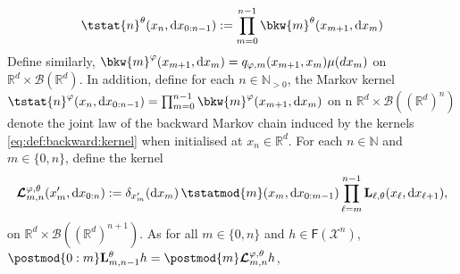 \documentclass{article}
\newcommand{\Xfd}{\mathcal{X}}
\newcommand{\precpar}{\varphi}
\newcommand{\intvect}[2]{\{ #1, #2 \}}
\newcommand{\nset}{\mathbb{N}}
\newcommand{\nsetpos}{\mathbb{N}_{> 0}}
\newcommand{\1}{\mathbbm{1}}
\newcommand{\retrokmod}{\boldsymbol{\mathcal{L}}^{\precpar,\theta}}
\newcommand{\uk}[1]{\mathbf{L}_{#1}}
\newcommand{\tensprod}{\otimes}
\newcommand{\Xset}{\mathsf{X}}
\newcommand{\parvec}{\theta}
\newcommand{\bmf}[1]{\set{F}(#1)}
\newcommand{\set}[1]{\mathsf{#1}}
\newcommand{\rmd}{\ensuremath{\mathrm{d}}}
\newcommand{\eqdef}{\ensuremath{:=}}
\begin{document}
\begin{equation} \label{eq:def:tstat}
\tstat{n}^\parvec(x_n, \rmd x_{0:n - 1}) \eqdef \prod_{m = 0}^{n - 1} \bkw{m}^\parvec(x_{m + 1}, \rmd x_m)
\end{equation}
Define similarly, $\bkw{m}^\varphi(x_{m + 1}, \rmd x_m) = q_{\varphi,m}(x_{m+1},x_m)\mu(dx_m)$
on $\mathbb{R}^d \times \mathcal{B}(\mathbb{R}^d)$. In addition, define for each $n \in \nsetpos$, the Markov kernel  $\tstat{n}^\varphi(x_n, \rmd x_{0:n - 1}) = \prod_{m = 0}^{n - 1} \bkw{m}^\varphi(x_{m + 1}, \rmd x_m)$ on n $\mathbb{R}^d \times \mathcal{B}((\mathbb{R}^d)^n)$ denote the joint law of the backward Markov chain induced by the kernels \eqref{eq:def:backward:kernel} when initialised at $x_n \in \mathbb{R}^d$. %
    For each $n \in \nset$ and $m \in \intvect{0}{n}$, define the kernel  
\begin{equation} \label{eq:def:retrokmod}
    \retrokmod_{m, n}(x_m', \rmd x_{0:n}) \eqdef \delta_{x_m'}(\rmd x_m) \, \tstatmod{m}(x_m, \rmd x_{0:m - 1}) \prod_{\ell = m}^{n - 1} \uk{\ell,\theta}(x_\ell, \rmd x_{\ell + 1}), 
\end{equation}
on  $\mathbb{R}^d \times \mathcal{B}((\mathbb{R}^d)^{n+1})$. 
As for all $m \in \intvect{0}{n}$ and $h \in \bmf{\Xfd^n}$, 
 $\postmod{0:m} \uk{m, n - 1}^\theta h = \postmod{m} \retrokmod_{m, n} h$,
\end{document}
